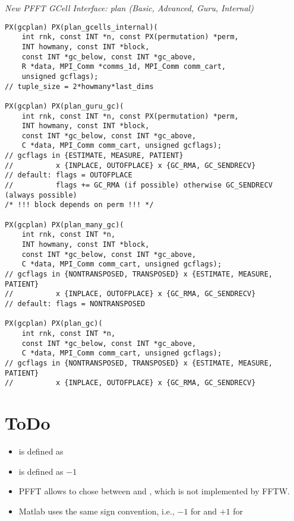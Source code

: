 \emph{New PFFT GCell Interface: plan (Basic, Advanced, Guru, Internal)}
\begin{lstlisting}
PX(gcplan) PX(plan_gcells_internal)(
    int rnk, const INT *n, const PX(permutation) *perm,
    INT howmany, const INT *block,
    const INT *gc_below, const INT *gc_above,
    R *data, MPI_Comm *comms_1d, MPI_Comm comm_cart,
    unsigned gcflags);
// tuple_size = 2*howmany*last_dims

PX(gcplan) PX(plan_guru_gc)(
    int rnk, const INT *n, const PX(permutation) *perm,
    INT howmany, const INT *block,
    const INT *gc_below, const INT *gc_above,
    C *data, MPI_Comm comm_cart, unsigned gcflags);
// gcflags in {ESTIMATE, MEASURE, PATIENT}
//          x {INPLACE, OUTOFPLACE} x {GC_RMA, GC_SENDRECV}
// default: flags = OUTOFPLACE
//          flags += GC_RMA (if possible) otherwise GC_SENDRECV (always possible)
/* !!! block depends on perm !!! */

PX(gcplan) PX(plan_many_gc)(
    int rnk, const INT *n,
    INT howmany, const INT *block,
    const INT *gc_below, const INT *gc_above,
    C *data, MPI_Comm comm_cart, unsigned gcflags);
// gcflags in {NONTRANSPOSED, TRANSPOSED} x {ESTIMATE, MEASURE, PATIENT}
//          x {INPLACE, OUTOFPLACE} x {GC_RMA, GC_SENDRECV}
// default: flags = NONTRANSPOSED

PX(gcplan) PX(plan_gc)(
    int rnk, const INT *n,
    const INT *gc_below, const INT *gc_above,
    C *data, MPI_Comm comm_cart, unsigned gcflags);
// gcflags in {NONTRANSPOSED, TRANSPOSED} x {ESTIMATE, MEASURE, PATIENT}
//          x {INPLACE, OUTOFPLACE} x {GC_RMA, GC_SENDRECV}
\end{lstlisting}


\chapter{ToDo}\label{chap:todo}

\begin{itemize}
  \item {} is defined as 
  \item {} is defined as $-1$
  \item PFFT allows to chose between  and , which is not implemented by FFTW.
  \item Matlab uses the same sign convention, i.e., $-1$ for  and $+1$ for 
\end{itemize}

